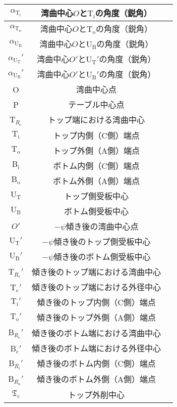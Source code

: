 \begin{longtable}{|c|Sl|}
$\alpha_{\mathrm T_\mathrm i}$ & 湾曲中心$O$と$\mathrm T_\mathrm i$の角度（鋭角）\\\hline
$\alpha_{\mathrm T_\mathrm o}$ & 湾曲中心$O$と$\mathrm T_\mathrm o$の角度（鋭角）\\\hline
$\alpha_{\mathrm U_\mathrm B}$ & 湾曲中心$O$と$\mathrm U_\mathrm B$の角度（鋭角）\\\hline
$\alpha_{\mathrm U_\mathrm T}'$ & 湾曲中心$O'$と$\mathrm U_\mathrm T'$の角度（鋭角）\\\hline
$\alpha_{\mathrm U_\mathrm B}'$ & 湾曲中心$O'$と$\mathrm U_\mathrm B'$の角度（鋭角）\\\hline
\hline
O & 湾曲中心点\\\hline
P & テーブル中心点\\\hline
T$_{R_\mathrm c}$ & トップ端における湾曲中心\\\hline
$\mathrm T_\mathrm i$ & トップ内側（C側）端点\\\hline
$\mathrm T_\mathrm o$ & トップ外側（A側）端点\\\hline
$\mathrm B_\mathrm i$ & ボトム内側（C側）端点\\\hline
$\mathrm B_\mathrm o$ & ボトム外側（A側）端点\\\hline
$\mathrm U_\mathrm T$ & トップ側受板中心\\\hline
$\mathrm U_\mathrm B$ & ボトム側受板中心\\\hline
$O'$ & $-\psi$傾き後の湾曲中心点\\\hline
$\mathrm U_\mathrm T'$ & $-\psi$傾き後のトップ側受板中心\\\hline
$\mathrm U_\mathrm B'$ & $-\psi$傾き後のボトム側受板中心\\\hline
T$_{R_\mathrm c}'$ & 傾き後のトップ端における湾曲中心\\\hline
T$_\mathrm c'$ & 傾き後のトップ端における外径中心\\\hline
$\mathrm T_\mathrm i'$ & 傾き後のトップ内側（C側）端点\\\hline
$\mathrm T_\mathrm o'$ & 傾き後のトップ外側（A側）端点\\\hline
B$_{R_\mathrm c}'$ & 傾き後のボトム端における湾曲中心\\\hline
B$_\mathrm c'$ & 傾き後のボトム端における外径中心\\\hline
B$_{R_\mathrm i}'$ & 傾き後のボトム内側（C側）端点\\\hline
B$_{R_\mathrm o}'$ & 傾き後のボトム外側（A側）端点\\\hline
$\mathfrak T_\mathrm c$ & トップ外削中心\\\hline

\end{longtable}
